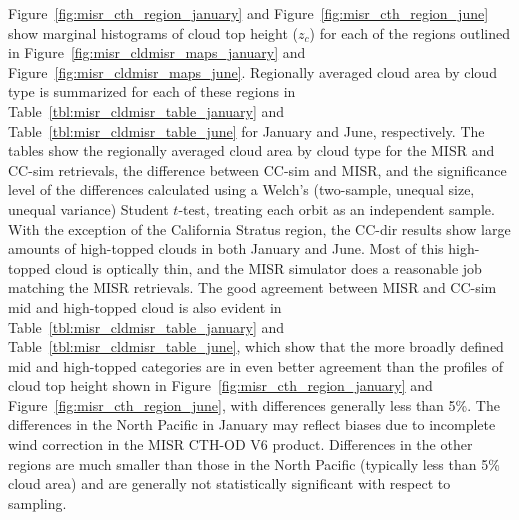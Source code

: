 Figure~\ref{fig:misr_cth_region_january} and
Figure~\ref{fig:misr_cth_region_june} show marginal histograms of cloud
top height (\(z_c\)) for each of the regions outlined in
Figure~\ref{fig:misr_cldmisr_maps_january} and
Figure~\ref{fig:misr_cldmisr_maps_june}. Regionally averaged cloud area
by cloud type is summarized for each of these regions in
Table~\ref{tbl:misr_cldmisr_table_january} and
Table~\ref{tbl:misr_cldmisr_table_june} for January and June,
respectively. The tables show the regionally averaged cloud area by
cloud type for the MISR and CC-sim retrievals, the difference between
CC-sim and MISR, and the significance level of the differences
calculated using a Welch's (two-sample, unequal size, unequal variance)
Student \(t\)-test, treating each orbit as an independent sample. With
the exception of the California Stratus region, the CC-dir results show
large amounts of high-topped clouds in both January and June. Most of
this high-topped cloud is optically thin, and the MISR simulator does a
reasonable job matching the MISR retrievals. The good agreement between
MISR and CC-sim mid and high-topped cloud is also evident in
Table~\ref{tbl:misr_cldmisr_table_january} and
Table~\ref{tbl:misr_cldmisr_table_june}, which show that the more
broadly defined mid and high-topped categories are in even better
agreement than the profiles of cloud top height shown in
Figure~\ref{fig:misr_cth_region_january} and
Figure~\ref{fig:misr_cth_region_june}, with differences generally less
than 5\%. The differences in the North Pacific in January may reflect
biases due to incomplete wind correction in the MISR CTH-OD V6 product.
Differences in the other regions are much smaller than those in the
North Pacific (typically less than 5\% cloud area) and are generally not
statistically significant with respect to sampling.

